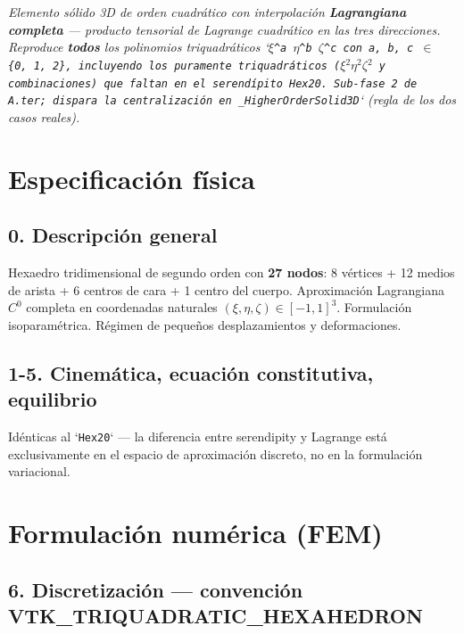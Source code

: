 \documentclass[11pt,letterpaper,oneside]{report}
\begin{document}
\textit{Elemento sólido 3D de orden cuadrático con interpolación \textbf{Lagrangiana completa} --- producto tensorial de Lagrange cuadrático en las tres direcciones. Reproduce \textbf{todos} los polinomios triquadráticos `\texttt{\ensuremath{\xi}\textasciicircum{}a \ensuremath{\eta}\textasciicircum{}b \ensuremath{\zeta}\textasciicircum{}c}\texttt{ con }\texttt{a, b, c \ensuremath{\in} \{0, 1, 2\}}\texttt{, incluyendo los puramente triquadráticos (}\texttt{\ensuremath{\xi}\ensuremath{^{2}}\ensuremath{\eta}\ensuremath{^{2}}\ensuremath{\zeta}\ensuremath{^{2}}}\texttt{ y combinaciones) que faltan en el serendípito }\texttt{Hex20}\texttt{. Sub-fase 2 de A.ter; dispara la centralización en }\texttt{\_HigherOrderSolid3D}` (regla de los dos casos reales).}



\section{Especificación física}

\subsection{0. Descripción general}

Hexaedro tridimensional de segundo orden con \textbf{27 nodos}: 8 vértices + 12 medios de arista + 6 centros de cara + 1 centro del cuerpo. Aproximación Lagrangiana $C^0$ completa en coordenadas naturales $(\xi, \eta, \zeta) \in [-1, 1]^3$. Formulación isoparamétrica. Régimen de pequeños desplazamientos y deformaciones.

\subsection{1-5. Cinemática, ecuación constitutiva, equilibrio}

Idénticas al `\texttt{Hex20}` --- la diferencia entre serendipity y Lagrange está exclusivamente en el espacio de aproximación discreto, no en la formulación variacional.


\section{Formulación numérica (FEM)}

\subsection{6. Discretización --- convención VTK\_TRIQUADRATIC\_HEXAHEDRON}
\end{document}
